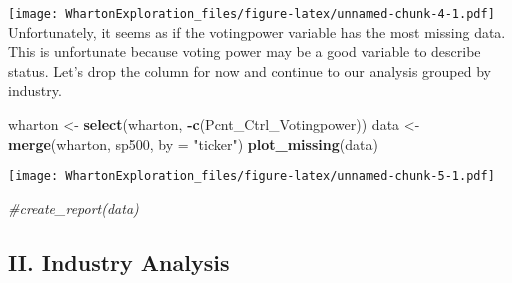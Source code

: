 \documentclass[]{article}
\newenvironment{Shaded}{\begin{snugshade}}{\end{snugshade}}
\newcommand{\CommentTok}[1]{\textcolor[rgb]{0.56,0.35,0.01}{\textit{#1}}}
\newcommand{\DataTypeTok}[1]{\textcolor[rgb]{0.13,0.29,0.53}{#1}}
\newcommand{\DecValTok}[1]{\textcolor[rgb]{0.00,0.00,0.81}{#1}}
\newcommand{\KeywordTok}[1]{\textcolor[rgb]{0.13,0.29,0.53}{\textbf{#1}}}
\newcommand{\NormalTok}[1]{#1}
\newcommand{\OperatorTok}[1]{\textcolor[rgb]{0.81,0.36,0.00}{\textbf{#1}}}
\newcommand{\StringTok}[1]{\textcolor[rgb]{0.31,0.60,0.02}{#1}}
\begin{document}
\texttt{[image: WhartonExploration\_files/figure-latex/unnamed-chunk-4-1.pdf]}
Unfortunately, it seems as if the votingpower variable has the most
missing data. This is unfortunate because voting power may be a good
variable to describe status. Let's drop the column for now and continue
to our analysis grouped by industry.

\begin{Shaded}
\begin{Highlighting}[]
\NormalTok{wharton <-}\StringTok{ }\KeywordTok{select}\NormalTok{(wharton, }\OperatorTok{-}\KeywordTok{c}\NormalTok{(Pcnt_Ctrl_Votingpower))}
\NormalTok{data <-}\StringTok{ }\KeywordTok{merge}\NormalTok{(wharton, sp500, }\DataTypeTok{by =} \StringTok{"ticker"}\NormalTok{)}
\KeywordTok{plot_missing}\NormalTok{(data)}
\end{Highlighting}
\end{Shaded}

\texttt{[image: WhartonExploration\_files/figure-latex/unnamed-chunk-5-1.pdf]}

\begin{Shaded}
\end{Shaded}

\begin{Shaded}
\begin{Highlighting}[]
\CommentTok{#create_report(data)}
\end{Highlighting}
\end{Shaded}

\hypertarget{ii.-industry-analysis}{%
\subsection{II. Industry Analysis}\label{ii.-industry-analysis}}

\begin{Shaded}
\end{Shaded}
\end{document}
